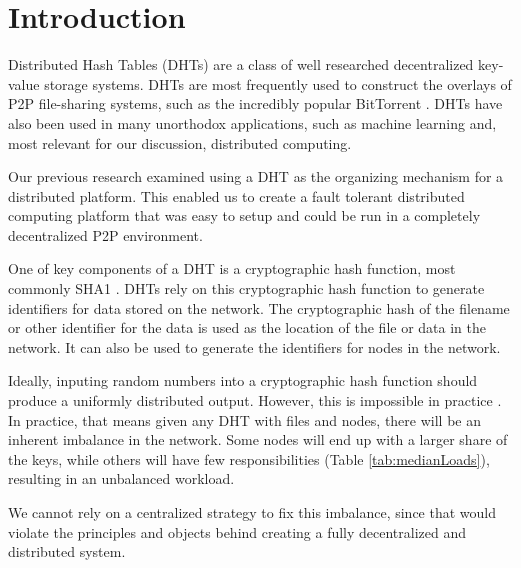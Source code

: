 \documentclass[11pt,conference]{IEEEtran}
\begin{document}

\section{Introduction}


Distributed Hash Tables (DHTs) are a class of well researched decentralized key-value storage systems.
DHTs are most frequently used to construct the overlays of P2P file-sharing systems, such as the incredibly popular BitTorrent \cite{bittorrent}.
DHTs have also been used in many unorthodox applications, such as machine learning \cite{liparameter} and, most relevant for our discussion, distributed computing.

Our previous research \cite{chordreduce} examined using a DHT as the organizing mechanism for a distributed platform.
This enabled us to create a fault tolerant distributed computing platform that was easy to setup and could be run in a completely decentralized P2P environment.

One of key components of a DHT is a cryptographic hash function, most commonly SHA1 \cite{sha1}.
DHTs rely on this cryptographic hash function to generate identifiers for data stored on the network.
The cryptographic hash of the filename or other identifier for the data is used as the location of the file or data in the network.
It can also be used to generate the identifiers for nodes in the network.

Ideally, inputing random numbers into a cryptographic hash function should produce a uniformly distributed output.
However, this is impossible in practice \cite{hash-outputs} \cite{thomsen2005cryptographic}.
In practice, that means given any DHT with files and nodes, there will be an inherent imbalance in the network.
Some nodes will end up with a larger share of the keys, while others will have few responsibilities (Table \ref{tab:medianLoads}), resulting in an unbalanced workload.

We cannot rely on a centralized strategy to fix this imbalance, since that would violate the principles and objects behind creating a fully decentralized and distributed system.
\end{document}
